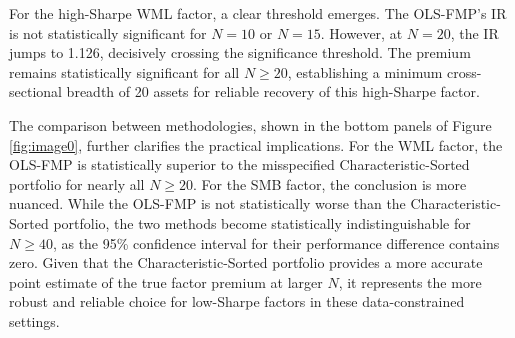 \documentclass[]{article}
\begin{document}
For the high-Sharpe WML factor, a clear threshold emerges. The OLS-FMP's IR is not statistically significant for $N=10$ or $N=15$. However, at $N=20$, the IR jumps to 1.126, decisively crossing the significance threshold. The premium remains statistically significant for all $N \ge 20$, establishing a minimum cross-sectional breadth of 20 assets for reliable recovery of this high-Sharpe factor.

The comparison between methodologies, shown in the bottom panels of Figure \ref{fig:image0}, further clarifies the practical implications. For the WML factor, the OLS-FMP is statistically superior to the misspecified Characteristic-Sorted portfolio for nearly all $N \ge 20$. For the SMB factor, the conclusion is more nuanced. While the OLS-FMP is not statistically worse than the Characteristic-Sorted portfolio, the two methods become statistically indistinguishable for $N \ge 40$, as the 95\% confidence interval for their performance difference contains zero. Given that the Characteristic-Sorted portfolio provides a more accurate point estimate of the true factor premium at larger $N$, it represents the more robust and reliable choice for low-Sharpe factors in these data-constrained settings.
\end{document}
